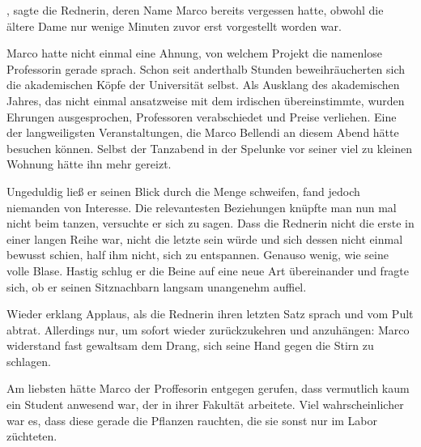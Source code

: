 \par

, sagte die Rednerin, deren Name Marco bereits vergessen hatte, obwohl die ältere Dame nur wenige Minuten zuvor erst vorgestellt worden war. 

\par

Marco hatte nicht einmal eine Ahnung, von welchem Projekt die namenlose Professorin gerade sprach. Schon seit anderthalb Stunden beweihräucherten sich die akademischen Köpfe der Universität selbst. Als Ausklang des akademischen Jahres, das nicht einmal ansatzweise mit dem irdischen übereinstimmte, wurden Ehrungen ausgesprochen, Professoren verabschiedet und Preise verliehen. Eine der langweiligsten Veranstaltungen, die Marco Bellendi an diesem Abend hätte besuchen können. Selbst der Tanzabend in der Spelunke vor seiner viel zu kleinen Wohnung hätte ihn mehr gereizt.

\par

Ungeduldig ließ er seinen Blick durch die Menge schweifen, fand jedoch niemanden von Interesse. Die relevantesten Beziehungen knüpfte man nun mal nicht beim tanzen, versuchte er sich zu sagen. Dass die Rednerin nicht die erste in einer langen Reihe war, nicht die letzte sein würde und sich dessen nicht einmal bewusst schien, half ihm nicht, sich zu entspannen. Genauso wenig, wie seine volle Blase. Hastig schlug er die Beine auf eine neue Art übereinander und fragte sich, ob er seinen Sitznachbarn langsam unangenehm auffiel.

\par

Wieder erklang Applaus, als die Rednerin ihren letzten Satz sprach und vom Pult abtrat. Allerdings nur, um sofort wieder zurückzukehren und anzuhängen:  Marco widerstand fast gewaltsam dem Drang, sich seine Hand gegen die Stirn zu schlagen. 

\par

Am liebsten hätte Marco der Proffesorin entgegen gerufen, dass vermutlich kaum ein Student anwesend war, der in ihrer Fakultät arbeitete. Viel wahrscheinlicher war es, dass diese gerade die Pflanzen rauchten, die sie sonst nur im Labor züchteten.


